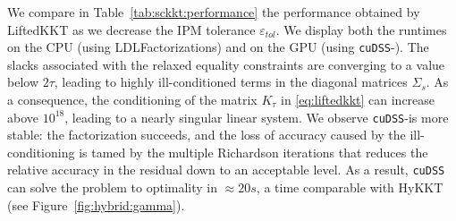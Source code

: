 We compare in Table~\ref{tab:sckkt:performance} the performance obtained by LiftedKKT
as we decrease the IPM tolerance $\varepsilon_{tol}$.
We display both the runtimes on the CPU (using LDLFactorizations) and on the GPU (using {\tt cuDSS}-\ldlt).
The slacks associated with the relaxed equality constraints are converging to a value below $2 \tau$,
leading to highly ill-conditioned terms in the diagonal matrices $\Sigma_s$.
As a consequence, the conditioning of the matrix $K_\tau$ in \eqref{eq:liftedkkt} can increase
above $10^{18}$, leading to a nearly singular linear system.
We observe {\tt cuDSS}-\ldlt is more stable: the factorization
succeeds, and the loss of accuracy caused by the ill-conditioning is tamed by the multiple
Richardson iterations that reduces the relative accuracy in the residual down to an acceptable level.
As a result, {\tt cuDSS} can solve
the problem to optimality in $\approx 20s$, a time comparable with HyKKT (see Figure~\ref{fig:hybrid:gamma}).

\begin{table}[!ht]
  \centering
  \label{tab:sckkt:performance}
  \caption{Performance of the equality-relaxation
    strategy as we decrease the IPM tolerance $\varepsilon_{tol}$.
    The table displays the wall time on the CPU (using CHOLMOD)
    and on the GPU (using cuDSS-\ldlt). (A30 GPU)
  }
\end{table}

